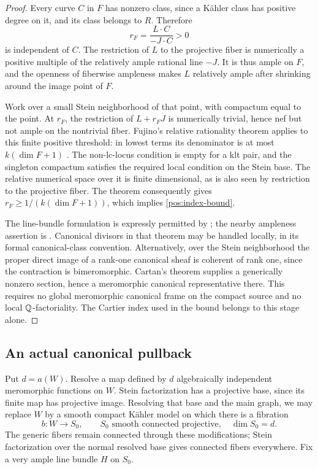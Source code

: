 \begin{proof}
Every curve \(C\) in \(F\) has nonzero class, since a Kähler class
has positive degree on it, and its class belongs to \(R\). Therefore
\[
 r_F=\frac{L\cdot C}{-J\cdot C}>0
\]
is independent of \(C\). The restriction of \(L\) to the projective
fiber is numerically a positive multiple of the relatively ample
rational line \(-J\). It is thus ample on \(F\), and the openness of
fiberwise ampleness makes \(L\) relatively ample after shrinking around
the image point of \(F\).

Work over a small Stein neighborhood of that point, with compactum
equal to the point. At \(r_F\), the restriction of \(L+r_FJ\) is
numerically trivial, hence nef but not ample on the nontrivial fiber.
Fujino's relative rationality theorem applies to this finite positive
threshold: in lowest terms its denominator is at most
\(k(\dim F+1)\) \cite[Theorem~4.3.1]{FujinoAnalyticCone}. The
non-lc-locus condition is empty for a klt pair, and the singleton
compactum satisfies the required local condition on the Stein base.
The relative numerical space over it is finite dimensional, as is also
seen by restriction to the projective fiber. The theorem consequently
gives \(r_F\geq1/(k(\dim F+1))\), which implies
\eqref{pos:index-bound}.

The line-bundle formulation is expressly permitted by
\cite[Remark~4.3.4]{FujinoAnalyticCone}; the nearby ampleness assertion
is \cite[Lemma~2.2.4]{FujinoAnalyticCone}. Canonical divisors in that
theorem may be handled locally, in its formal canonical-class
convention. Alternatively, over the Stein neighborhood the proper
direct image of a rank-one canonical sheaf is coherent of rank one,
since the contraction is bimeromorphic. Cartan's theorem supplies a
generically nonzero section, hence a meromorphic canonical
representative there. This requires no global meromorphic canonical
frame on the compact source and no local \(\mathbb{Q}\)-factoriality. The
Cartier index used in the bound belongs to this stage alone.
\end{proof}

\subsection{An actual canonical pullback}

Put \(d=a(W)\). Resolve a map defined by \(d\) algebraically independent
meromorphic functions on \(W\). Stein factorization has a projective
base, since its finite map has projective image. Resolving that base
and the main graph, we may replace \(W\) by a smooth compact Kähler
model on which there is a fibration
\[
 b:W\longrightarrow S_0,
 \qquad S_0\text{ smooth connected projective},\quad\dim S_0=d.
\]
The generic fibers remain connected through these modifications; Stein
factorization over the normal resolved base gives connected fibers
everywhere. Fix a very ample line bundle \(H\) on \(S_0\).

